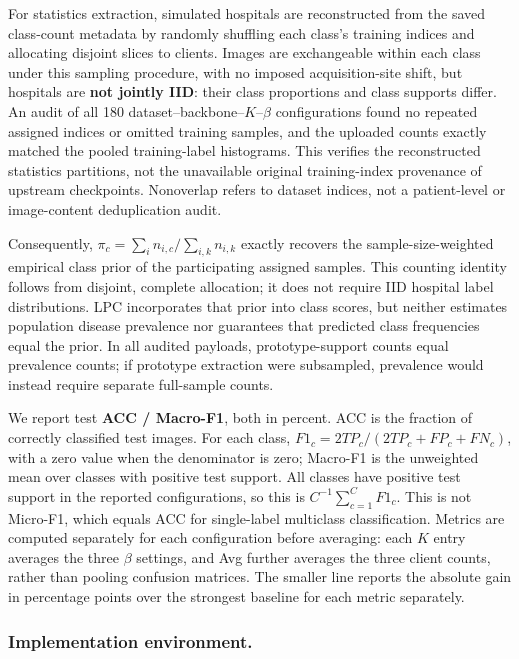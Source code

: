 \documentclass[journal,twoside,web]{ieeecolor}
\begin{document}
For statistics extraction, simulated hospitals are reconstructed from the saved class-count metadata by randomly shuffling each class's training indices and allocating disjoint slices to clients. Images are exchangeable within each class under this sampling procedure, with no imposed acquisition-site shift, but hospitals are \textbf{not jointly IID}: their class proportions and class supports differ. An audit of all 180 dataset--backbone--$K$--$\beta$ configurations found no repeated assigned indices or omitted training samples, and the uploaded counts exactly matched the pooled training-label histograms. This verifies the reconstructed statistics partitions, not the unavailable original training-index provenance of upstream checkpoints. Nonoverlap refers to dataset indices, not a patient-level or image-content deduplication audit.

Consequently, $\pi_c=\sum_i n_{i,c}/\sum_{i,k}n_{i,k}$ exactly recovers the sample-size-weighted empirical class prior of the participating assigned samples. This counting identity follows from disjoint, complete allocation; it does not require IID hospital label distributions. LPC incorporates that prior into class scores, but neither estimates population disease prevalence nor guarantees that predicted class frequencies equal the prior. In all audited payloads, prototype-support counts equal prevalence counts; if prototype extraction were subsampled, prevalence would instead require separate full-sample counts.

We report test \textbf{ACC / Macro-F1}, both in percent. ACC is the fraction of correctly classified test images. For each class, $F1_c=2TP_c/(2TP_c+FP_c+FN_c)$, with a zero value when the denominator is zero; Macro-F1 is the unweighted mean over classes with positive test support. All classes have positive test support in the reported configurations, so this is $C^{-1}\sum_{c=1}^{C}F1_c$. This is not Micro-F1, which equals ACC for single-label multiclass classification. Metrics are computed separately for each configuration before averaging: each $K$ entry averages the three $\beta$ settings, and Avg further averages the three client counts, rather than pooling confusion matrices. The smaller line reports the absolute gain in percentage points over the strongest baseline for each metric separately.

\subsubsection{Implementation environment.}
\end{document}
